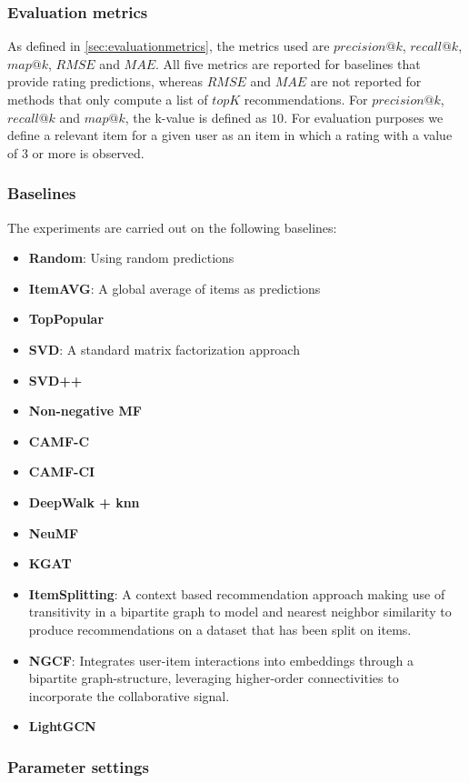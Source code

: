 \subsubsection{Evaluation metrics}
As defined in \autoref{sec:evaluationmetrics}, the metrics used are $precision@k$, $recall@k$, $map@k$, $RMSE$ and $MAE$.
All five metrics are reported for baselines that provide rating predictions, whereas $RMSE$ and $MAE$ are not reported for methods that only compute a list of $topK$ recommendations.
For $precision@k$, $recall@k$ and $map@k$, the k-value is defined as $10$.
For evaluation purposes we define a relevant item for a given user as an item in which a rating with a value of $3$ or more is observed. 
\subsubsection{Baselines}
The experiments are carried out on the following baselines:
\begin{itemize}
    \item \textbf{Random}: Using random predictions
    \item \textbf{ItemAVG}: A global average of items as predictions
    \item \textbf{TopPopular}
    \item \textbf{SVD\cite{standardMF}}: A standard matrix factorization approach
    \item \textbf{SVD++\cite{svd++}}
    \item \textbf{Non-negative MF\cite{NMF}}
    \item \textbf{CAMF-C\cite{baltrunasCAMF}}
    \item \textbf{CAMF-CI\cite{baltrunasCAMF}}
    \item \textbf{DeepWalk + knn\cite{DeepWalk}}
    \item \textbf{NeuMF\cite{neuMF}}
    \item \textbf{KGAT\cite{KGAT}}
    \item \textbf{ItemSplitting\cite{GraphBasedCollaborativePaper}}: A context based recommendation approach making use of transitivity in a bipartite graph to model and nearest neighbor similarity to produce recommendations on a dataset that has been split on items.
    \item \textbf{NGCF\cite{NGCF}}: Integrates user-item interactions into embeddings through a bipartite graph-structure, leveraging higher-order connectivities to incorporate the collaborative signal.
    \item \textbf{LightGCN\cite{LightGCN}}
\end{itemize}
\subsubsection{Parameter settings}